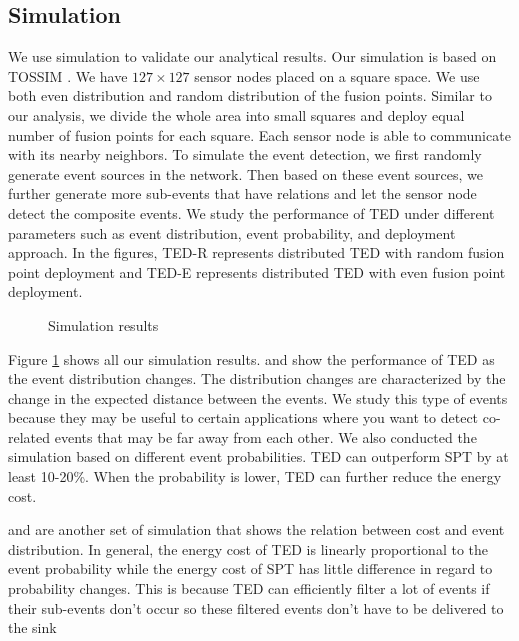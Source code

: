 \subsection{Simulation}
\label{sec:simulation}
We use simulation to validate our analytical results. Our simulation is based on TOSSIM \cite{tossim}. We have \(127\times 127\) sensor nodes placed on a square space. We use both even distribution and random distribution of the fusion points. Similar to our analysis, we divide the whole area into small squares and deploy equal number of fusion points for each square. Each sensor node is able to communicate with its nearby neighbors. To simulate the event detection, we first randomly generate event sources in the network. Then based on these event sources, we further generate more sub-events that have relations and let the sensor node detect the composite events. We study the performance of TED under different parameters such as event distribution, event probability, and deployment approach. In the figures, TED-R represents distributed TED with random fusion point deployment and TED-E represents distributed TED with even fusion point deployment.

\begin{figure}
\centering
{}
\qquad
{}
\caption{Simulation results}
\label{fig:sim-all}
\end{figure}

Figure \ref{fig:sim-all} shows all our simulation results.  and  show the performance of TED as the event distribution changes. The distribution changes are characterized by the change in the expected distance between the events. We study this type of events because they may be useful to certain applications where you want to detect co-related events that may be far away from each other. We also conducted the simulation based on different event probabilities. TED can outperform SPT by at least 10-20\%. When the probability is lower, TED can further reduce the energy cost.

 and are another set of simulation that shows the relation between cost and event distribution. In general, the energy cost of TED is linearly proportional to the event probability while the energy cost of SPT has little difference in regard to probability changes. This is because TED can efficiently filter a lot of events if their sub-events don't occur so these filtered events don't have to be delivered to the sink

